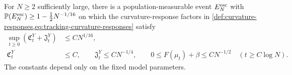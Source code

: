 \begin{lemma}
\label{lem:canonical-response-control}
For $N\ge2$ sufficiently large, there is a population-measurable event
$E_N^{\rm esc}$ with $\mathbb P(E_N^{\rm esc})\ge1-\tfrac12N^{-1/16}$
on which the curvature-response factors in
\cref{def:curvature-responses,eq:tracking-curvature-responses} satisfy
\begin{equation}
 \begin{aligned}
 \sup_{t\ge0}(\mathfrak C_t^Y+\mathfrak J_t^Y)&\le CN^{1/16},\\
 \mathfrak C_t^Y&\le C,\qquad
 \mathfrak J_t^Y\le CN^{-1/4},\qquad
 0\le F(\mu_t)+\beta\le CN^{-1/2}\quad(t\ge C\log N).
 \end{aligned}
 \label{eq:canonical-response-bounds}
\end{equation}
The constants depend only on the fixed model parameters.
\end{lemma}
